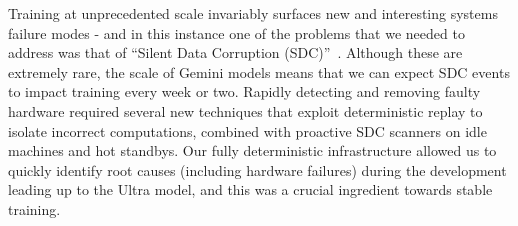 Training at unprecedented scale invariably surfaces new and interesting systems failure modes - and in this instance one of the problems that we needed to address was that of ``Silent Data Corruption (SDC)''~\cite{sdcs, sdc2, hochschild2021cores}. Although these are extremely rare, the scale of Gemini models means that we can expect SDC events to impact training every week or two. Rapidly detecting and removing faulty hardware required several new techniques that exploit deterministic replay to isolate incorrect computations, combined with proactive SDC scanners on idle machines and hot standbys. Our fully deterministic infrastructure allowed us to quickly identify root causes (including hardware failures) during the development leading up to the Ultra model, and this was a crucial ingredient towards stable training.
